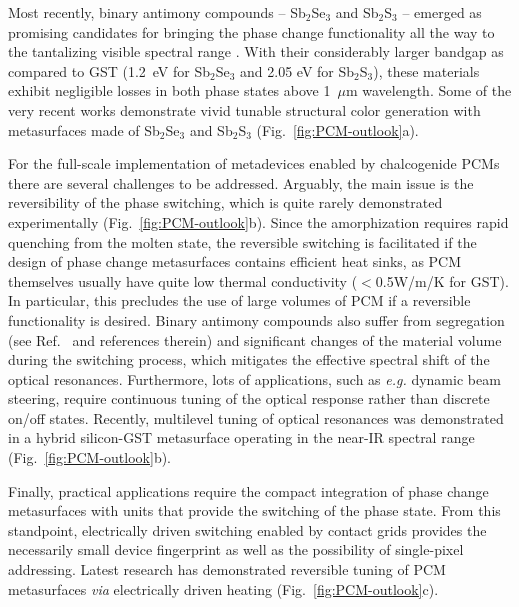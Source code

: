 \documentclass[journal=chreay,manuscript=review]{achemso}
\begin{document}
Most recently, binary antimony compounds – Sb$_2$Se$_3$ and Sb$_2$S$_3$ – emerged as promising candidates for bringing the phase change functionality all the way to the tantalizing visible spectral range \cite{dong2019wide,lu2021reversible}. With their considerably larger bandgap as compared to GST (1.2~eV for Sb$_2$Se$_3$ and 2.05 eV for Sb$_2$S$_3$), these materials exhibit negligible losses in both phase states above 1~$\mu$m wavelength. Some of the very recent works demonstrate vivid tunable structural color generation with metasurfaces made of Sb$_2$Se$_3$ and Sb$_2$S$_3$\cite{lu2021reversible,hemmatyar2021enhanced} (Fig.~\ref{fig:PCM-outlook}a).


For the full-scale implementation of metadevices enabled by chalcogenide PCMs there are several challenges to be addressed. Arguably, the main issue is the reversibility of the phase switching, which is quite rarely demonstrated experimentally\cite{galarreta2020reconfigurable,rybin2021optically} (Fig.~\ref{fig:PCM-outlook}b).  Since the amorphization requires rapid quenching from the molten state, the reversible switching is facilitated if the design of phase change metasurfaces contains efficient heat sinks, as PCM themselves usually have quite low thermal conductivity ($<$0.5W/m/K for GST). In particular, this precludes the use of large volumes of PCM if a reversible functionality is desired. Binary antimony compounds also suffer from segregation (see Ref.~\cite{delaney2020new} and references therein) and significant changes of the material volume during the switching process, which mitigates the effective spectral shift of the optical resonances. Furthermore, lots of applications, such as \textit{e.g.} dynamic beam steering, require continuous tuning of the optical response rather than discrete on/off states. Recently, multilevel tuning of optical resonances was demonstrated in a hybrid silicon-GST metasurface operating in the near-IR spectral range\cite{galarreta2020reconfigurable} (Fig.~\ref{fig:PCM-outlook}b).

Finally, practical applications require the compact integration of phase change metasurfaces with units that provide the switching of the phase state. From this standpoint, electrically driven switching enabled by contact grids provides the necessarily small device fingerprint as well as the possibility of single-pixel addressing. Latest research has demonstrated reversible tuning of PCM metasurfaces \textit{via} electrically driven heating \cite{wang2021electrical, zhang2021electrically,abdollahramezani2022electrically} (Fig.~\ref{fig:PCM-outlook}c).
\end{document}
